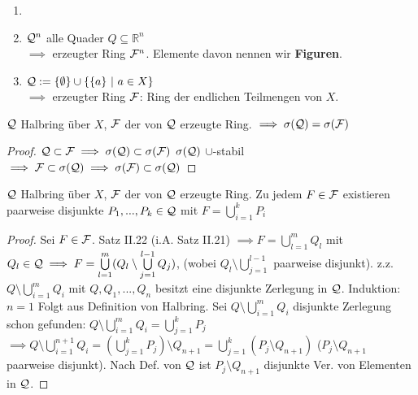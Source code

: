 \documentclass[11pt,a4paper,fleqn,openany]{report}
\begin{document}
    \begin{example}
      \begin{enumerate}
        \item[]
        \item $\mathcal{Q}^n$ alle Quader $Q \subseteq \mathbb{R}^n$\\
              $\implies$ erzeugter Ring $\mathcal{F}^n$. Elemente davon nennen wir \textbf{Figuren}. 
        \item $\mathcal{Q} := \{\emptyset\} \cup \{\{a\} \ | \ a \in X\}$\\
              $\implies$ erzeugter Ring $\mathcal{F}$: Ring der endlichen Teilmengen von $X$.
      \end{enumerate}
    \end{example}

    \begin{lemma}[i.A. II.23]
      $\mathcal{Q}$ Halbring über $X$, $\mathcal{F}$ der von $\mathcal{Q}$ erzeugte Ring. $\implies \sigma(\mathcal{Q}) = \sigma(\mathcal{F})$
    \end{lemma}

    \begin{proof}
      $\mathcal{Q} \subset \mathcal{F} \implies \sigma(\mathcal{Q}) \subset \sigma(\mathcal{F})$ \newline
      $\sigma(\mathcal{Q})$  $\cup$-stabil $\implies \mathcal{F}\subset \sigma(\mathcal{Q}) \implies \sigma(\mathcal{F}) \subset \sigma(\mathcal{Q})$
    \end{proof}

    \begin{lemma}[i.A. II.24]
      $\mathcal{Q}$ Halbring über $X$, $\mathcal{F}$ der von $\mathcal{Q}$ erzeugte Ring. Zu jedem $F \in \mathcal{F}$ existieren paarweise disjunkte $P_1, ..., P_k \in \mathcal{Q}$ mit $F = \bigcup\limits_{i=1}^k P_i$
    \end{lemma}

    \begin{proof}
      Sei $F\in \mathcal{F}$. \newline
      Satz II.22 (i.A. Satz II.21) $\implies F = \bigcup\limits_{l=1}^{m}Q_l$ mit $Q_l \in \mathcal{Q} \implies F = \bigcup\limits_{l=1}^{m}(Q_l\setminus \bigcup\limits_{j=1}^{l-1}Q_j)$, (wobei $Q_l\setminus \bigcup\limits_{j=1}^{l-1}$ paarweise disjunkt). \newline
      z.z. $Q\setminus \bigcup\limits_{i=1}^{m}Q_i$ mit $Q,Q_1,...,Q_n$ besitzt eine disjunkte Zerlegung in $\mathcal{Q}$. \newline
      Induktion: $n=1$ Folgt aus Definition von Halbring. Sei $Q\setminus\bigcup\limits_{i=1}^{m}Q_i$ disjunkte Zerlegung schon gefunden: $Q\setminus\bigcup\limits_{i=1}^{m}Q_i = \bigcup\limits_{j=1}^{k}P_j$ \newline
      $\implies Q\setminus\bigcup\limits_{i=1}^{n+1}Q_i = (\bigcup\limits_{j=1}^{k}P_j)\setminus Q_{n+1} = \bigcup\limits_{j=1}^{k}(P_j\setminus Q_{n+1})$ ($P_j\setminus Q_{n+1}$ paarweise disjunkt). \newline
      Nach Def. von $\mathcal{Q}$ ist $P_j\setminus Q_{n+1}$ disjunkte Ver. von Elementen in $\mathcal{Q}$. 
    \end{proof}
\end{document}
